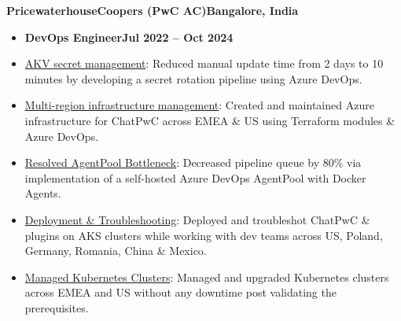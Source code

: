\documentclass[11pt,a4paper]{article}
\newenvironment{dashlist}{
  \begin{itemize}[label={--}]
}{
  \end{itemize}
}
\begin{document}
\noindent\textbf{PricewaterhouseCoopers (PwC AC)\hfill Bangalore, India}
\begin{itemize}
\item \textbf{DevOps Engineer\hfill Jul 2022 – Oct 2024}
\end{itemize}
\begin{dashlist}
    \item \uline {AKV secret management}: Reduced manual update time from 2 days to 10 minutes by developing a secret rotation pipeline using Azure DevOps.
    \item \uline {Multi-region infrastructure management}: Created and maintained Azure infrastructure for ChatPwC across EMEA \& US using Terraform modules \& Azure DevOps.
    \item \uline {Resolved AgentPool Bottleneck}: Decreased pipeline queue by 80\% via implementation of a self-hosted Azure DevOps AgentPool with Docker Agents.
    \item \uline {Deployment \& Troubleshooting}: Deployed and troubleshot ChatPwC \& plugins on AKS clusters while working with dev teams across US, Poland, Germany, Romania, China \& Mexico.
    \item \uline {Managed Kubernetes Clusters}: Managed and upgraded Kubernetes clusters across EMEA and US without any downtime post validating the prerequisites.

\end{dashlist}
\end{document}
